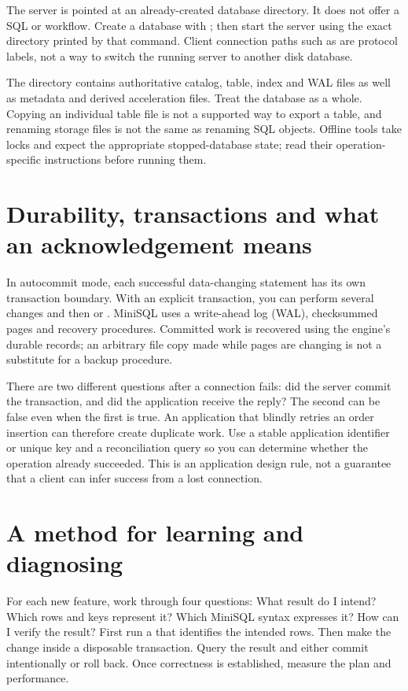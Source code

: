 

The server is pointed at an already-created database directory. It does not
offer a SQL  or  workflow. Create a
database with ; then start the server using the exact
directory printed by that command. Client connection paths such as
 are protocol labels, not a way to switch the running server to
another disk database.

The directory contains authoritative catalog, table, index and WAL files as
well as metadata and derived acceleration files. Treat the database as a
whole. Copying an individual table file is not a supported way to export a
table, and renaming storage files is not the same as renaming SQL objects.
Offline tools take locks and expect the appropriate stopped-database state;
read their operation-specific instructions before running them.

\section{Durability, transactions and what an acknowledgement means}
In autocommit mode, each successful data-changing statement has its own
transaction boundary. With an explicit transaction, you can perform several
changes and then  or . MiniSQL uses a write-ahead
log (WAL), checksummed pages and recovery procedures. Committed work is
recovered using the engine's durable records; an arbitrary file copy made
while pages are changing is not a substitute for a backup procedure.

There are two different questions after a connection fails: did the server
commit the transaction, and did the application receive the reply? The
second can be false even when the first is true. An application that blindly
retries an order insertion can therefore create duplicate work. Use a stable
application identifier or unique key and a reconciliation query so you can
determine whether the operation already succeeded. This is an application
design rule, not a guarantee that a client can infer success from a lost
connection.

\section{A method for learning and diagnosing}
For each new feature, work through four questions: What result do I intend?
Which rows and keys represent it? Which MiniSQL syntax expresses it? How can
I verify the result? First run a  that identifies the intended
rows. Then make the change inside a disposable transaction. Query the result
and either commit intentionally or roll back. Once correctness is established,
measure the plan and performance.

